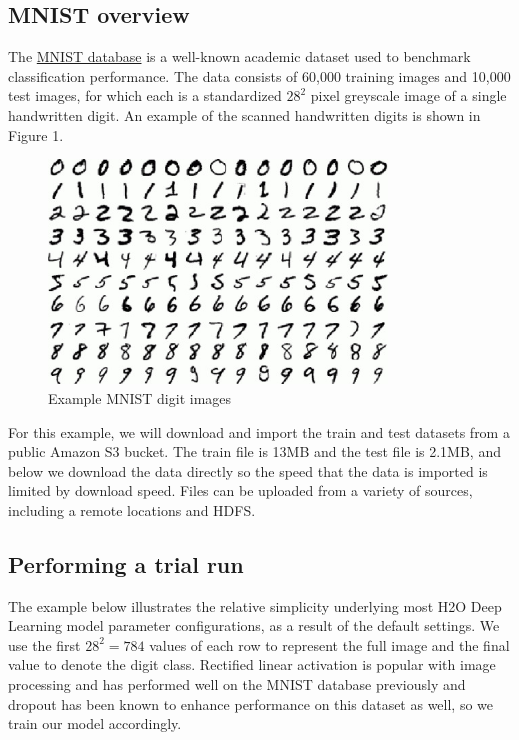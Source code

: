 \subsection{MNIST overview} 

The \href{http://yann.lecun.com/exdb/mnist/}{MNIST database} is a well-known academic dataset used to benchmark classification performance. The data consists of 60,000 training images and 10,000 test images, for which each is a standardized $28^2$ pixel greyscale image of a single handwritten digit.  An example of the scanned handwritten digits is shown in Figure 1. 

\begin{figure}[ht!]
\centering
\includegraphics[width=90mm]{./images/mnistdigits.jpg}
\caption{Example MNIST digit images \label{overflow}}
\end{figure}


For this example, we will download and import the train and test datasets from a public Amazon S3 bucket.%
The train file is 13MB and the test file is 2.1MB, and below we download the data directly so the speed that the data is imported is limited by download speed.  Files can be uploaded from a variety of sources, including a remote locations and HDFS.

\newpage
\waterExampleInR


\waterExampleInPython


\subsection{Performing a trial run}
\label{ssec:TrialRun} 
The example below illustrates the relative simplicity underlying most H2O Deep Learning model parameter configurations, as a result of the default settings. We use the first $28^2 = 784$ values of each row to represent the full image and the final value to denote the digit class. Rectified linear activation is popular with image processing and has performed well on the MNIST database previously and dropout has been known to enhance performance on this dataset as well, so we train our model accordingly. 

